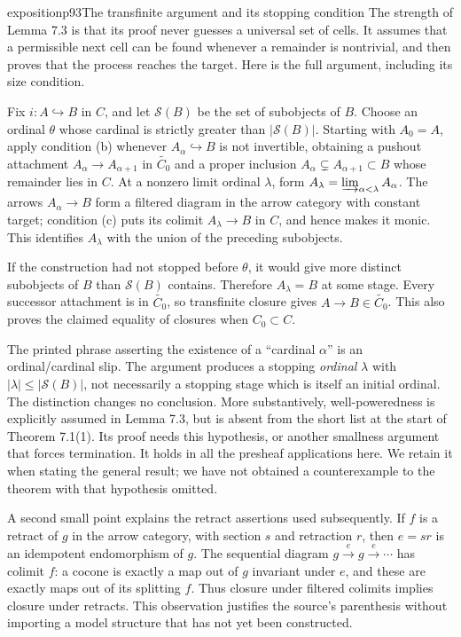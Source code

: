 \begin{dcomment}{exposition}{p93}{The transfinite argument and its stopping condition}
The strength of Lemma 7.3 is that its proof never guesses a universal set of cells. It assumes that a permissible next cell can be found whenever a remainder is nontrivial, and then proves that the process reaches the target. Here is the full argument, including its size condition.

Fix $i:A\hookrightarrow B$ in $C$, and let $\mathcal S(B)$ be the set of subobjects of $B$. Choose an ordinal $\theta$ whose cardinal is strictly greater than $|\mathcal S(B)|$. Starting with $A_0=A$, apply condition (b) whenever $A_\alpha\hookrightarrow B$ is not invertible, obtaining a pushout attachment $A_\alpha\to A_{\alpha+1}$ in $\widetilde{C_0}$ and a proper inclusion $A_\alpha\subsetneq A_{\alpha+1}\subset B$ whose remainder lies in $C$. At a nonzero limit ordinal $\lambda$, form $A_\lambda=\varinjlim_{\alpha<\lambda}A_\alpha$. The arrows $A_\alpha\to B$ form a filtered diagram in the arrow category with constant target; condition (c) puts its colimit $A_\lambda\to B$ in $C$, and hence makes it monic. This identifies $A_\lambda$ with the union of the preceding subobjects.

If the construction had not stopped before $\theta$, it would give more distinct subobjects of $B$ than $\mathcal S(B)$ contains. Therefore $A_\lambda=B$ at some stage. Every successor attachment is in $\widetilde{C_0}$, so transfinite closure gives $A\to B\in\widetilde{C_0}$. This also proves the claimed equality of closures when $C_0\subset C$.

The printed phrase asserting the existence of a ``cardinal $\alpha$'' is an ordinal/cardinal slip. The argument produces a stopping \emph{ordinal} $\lambda$ with $|\lambda|\leq|\mathcal S(B)|$, not necessarily a stopping stage which is itself an initial ordinal. The distinction changes no conclusion. More substantively, well-poweredness is explicitly assumed in Lemma 7.3, but is absent from the short list at the start of Theorem 7.1(1). Its proof needs this hypothesis, or another smallness argument that forces termination. It holds in all the presheaf applications here. We retain it when stating the general result; we have not obtained a counterexample to the theorem with that hypothesis omitted.

A second small point explains the retract assertions used subsequently. If $f$ is a retract of $g$ in the arrow category, with section $s$ and retraction $r$, then $e=sr$ is an idempotent endomorphism of $g$. The sequential diagram $g\xrightarrow e g\xrightarrow e\cdots$ has colimit $f$: a cocone is exactly a map out of $g$ invariant under $e$, and these are exactly maps out of its splitting $f$. Thus closure under filtered colimits implies closure under retracts. This observation justifies the source's parenthesis without importing a model structure that has not yet been constructed.
\end{dcomment}

